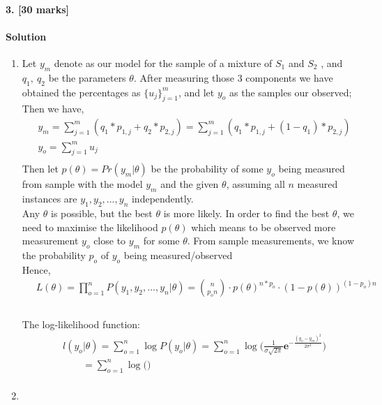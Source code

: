 \documentclass[a4paper]{scrartcl}
\begin{document}
\paragraph{3. [30 marks]}
\label{sec:Question 3}
\paragraph{Solution}
\begin{enumerate}[label=(\arabic*)]
  \item
  Let $y_m$ denote as our model for the sample of a mixture of $S_1$ and $S_2$ , and $q_1,\ q_2$ be the parameters $\theta$. After measuring those 3 components we have obtained the percentages as ${\{u_j\}_{j=1}^{m}}$, and let  $y_o$ as the samples our observed;
  Then we have,
  \begin{align*}
    &\ y_m = \sum_{j=1}^{m} (q_1* p_{1,j} + q_2* p_{2,j})= \sum_{j=1}^{m} (q_1* p_{1,j} + (1-q_1)* p_{2,j})\\ &\
     y_o = \sum_{j=1}^{m} u_j\\ &\
  \end{align*}
  Then let $p(\theta)=Pr(y_m|\theta)$ be the probability of some $y_o$ being measured from sample with the model $y_m$ and the given $\theta$, assuming all $n$ measured instances are $y_1,y_2,...,y_n$ independently. \\
  Any $\theta$ is possible, but the best $\theta$ is more likely. In order to find the best $\theta$, we need to maximise the likelihood $p(\theta)$ which means to be observed more measurement $y_o$ close to $y_m$ for some $\theta$. From sample measurements, we know the probability $p_o$ of $y_o$ being measured/observed\\
  Hence,
  \begin{align*}
   &\ L(\theta)=\prod_{o=1}^{n}P(y_1,y_2,...,y_n|\theta)=\binom{n}{p_on}\cdot p(\theta)^{n*p_o}\cdot (1-p(\theta))^{(1-p_o)n}\\ 
  \end{align*}
  \\
  The log-likelihood function:\\ 
  \begin{align*}
   &\ l(y_o|\theta)=\sum_{o=1}^{n}\log{P(y_o|\theta)}=\sum_{o=1}^{n}\log{\bigg( \frac{1}{\sigma \sqrt {2\pi}} \textbf{e}^{- \frac{(y_o-y_m)^2}{2\sigma^2}}\bigg)}\\ 
   &\ \qquad=\sum_{o=1}^{n}\log{\bigg( \bigg)}\\ &\
  \end{align*}
  \item
\end{enumerate}
\end{document}
